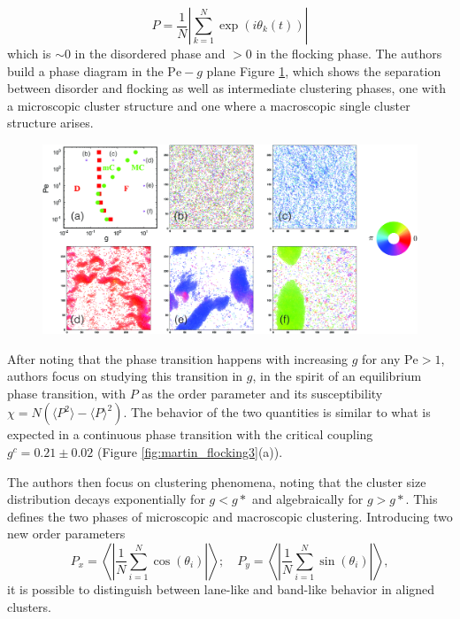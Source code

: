 \documentclass[../../master_thesis_np.tex]{subfiles}
\begin{document}
   	 \begin{equation}
   	 P = \frac{1}{N}\left| \sum_{k=1}^{N} \exp(i \theta_k(t)) \right|
   	 \end{equation}
  	 which is $\sim 0$ in the disordered phase and $> 0$ in the flocking phase. 
	 The authors build a phase diagram in the $\mathrm{Pe}-g$ plane Figure \ref{fig:martin_flocking1}, which shows the separation between disorder and flocking as well as intermediate clustering phases, one with a microscopic cluster structure and one where a macroscopic single cluster structure arises.
	
	\begin{figure}[h]
		\centering
		\includegraphics[width=\textwidth]{martin_phaseseparation.png}
		\caption{\cite{martin-gomez_collective_2018}}
		\label{fig:martin_flocking1}
	\end{figure}
	
	After noting that the phase transition happens with increasing $g$ for any $\mathrm{Pe} > 1$, authors focus on studying this transition in $g$, in the  spirit of an equilibrium phase transition, with $P$ as the order parameter and its susceptibility $\chi = N(\langle P^2 \rangle - \langle P \rangle^2)$. 
	The behavior of the two quantities is similar to what is expected in a continuous phase transition with the critical coupling $g^c = 0.21 \pm 0.02$ (Figure \ref{fig:martin_flocking3}(a)).
	
	The authors then focus on clustering phenomena, noting that the cluster size distribution decays exponentially for $g < g*$ and algebraically for $g > g*$. 
	This defines the two phases of microscopic and macroscopic clustering.
	Introducing two new order parameters
	\begin{equation} 
	P_x = \left\langle \left| \frac{1}{N} \sum_{i=1}^N \cos(\theta_i) \right| \right\rangle ; \quad
	P_y = \left\langle \left| \frac{1}{N} \sum_{i=1}^N \sin(\theta_i) \right| \right\rangle,
 	\end{equation}
 	it is possible to distinguish between lane-like and band-like behavior in aligned clusters.
 
\end{document}
